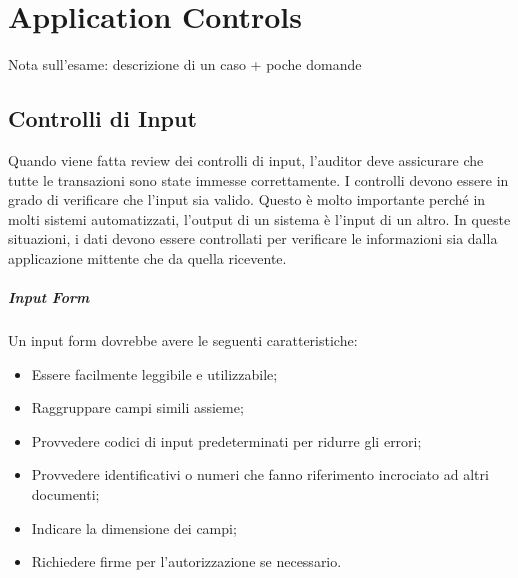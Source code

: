 \chapter{Application Controls}
\label{cs:ac}

Nota sull'esame: descrizione di un caso + poche domande

\section{Controlli di Input}
Quando viene fatta review dei controlli di input, l'auditor deve
assicurare che tutte le transazioni sono state immesse correttamente.
I controlli devono essere in grado di verificare che l'input sia valido.
Questo è molto importante perché in molti sistemi automatizzati,
l'output di un sistema è l'input di un altro. In queste situazioni,
i dati devono essere controllati per verificare le informazioni sia
dalla applicazione mittente che da quella ricevente.

\paragraph{Input Form}
Un input form dovrebbe avere le seguenti caratteristiche:
\begin{itemize}
\item Essere facilmente leggibile e utilizzabile;
\item Raggruppare campi simili assieme;
\item Provvedere codici di input predeterminati per ridurre
gli errori;
\item Provvedere identificativi o numeri che fanno riferimento
incrociato ad altri documenti;
\item Indicare la dimensione dei campi;
\item Richiedere firme per l'autorizzazione se necessario.
\end{itemize}


